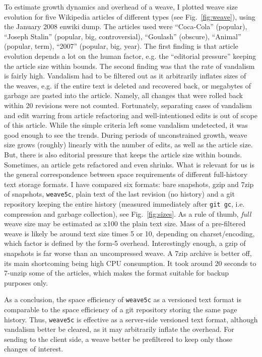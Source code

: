 \documentclass{sig-alternate}
\begin{document}
To estimate growth dynamics and overhead of a weave, I plotted weave size evolution for five Wikipedia articles of different types (see Fig.~\ref{fig:weave}), using the January 2008 enwiki dump.
The articles used were ``Coca-Cola'' (popular), ``Joseph Stalin'' (popular, big, controversial), ``Goulash'' (obscure), ``Animal'' (popular, term), ``2007'' (popular, big, year).
The first finding is that article evolution depends a lot on the human factor, e.g. the ``editorial pressure'' keeping the article size within bounds.
The second finding was that the rate of vandalism is fairly high.
Vandalism had to be filtered out as it arbitrarily inflates sizes of the weaves, e.g. if the entire text is deleted and recovered back, or megabytes of garbage are pasted into the article.
Namely, all changes that were rolled back within 20 revisions were  not counted.
Fortunately, separating cases of vandalism and edit warring from article refactoring and well-intentioned edits is out of scope of this article.
While the simple criteria left some vandalism undetected, it was good enough to see the trends.
During periods of unconstrained growth, weave size grows (roughly) linearly with the number of edits, as well as the article size.
But, there is also editorial pressure that keeps the article size within bounds. Sometimes, an article gets refactored and even shrinks.
What is relevant for us is the general correspondence between space requirements of different full-history text storage formats.
I have compared six formats: bare snapshots, gzip and 7zip of snapshots, {\tt weave5c}, plain text of the last revision (no history) and a git repository keeping the entire history (measured immediately after \verb+git gc+, i.e. compression and garbage collection), see Fig.~\ref{fig:sizes}.
As a rule of thumb, \emph{full} weave size may be estimated as x100 the plain text size.
Mass of a pre-filtered weave is likely be around text size times 5 or 10, depending on charset/encoding, which factor is defined by the form-5 overhead.
Interestingly enough, a gzip of snapshots is far worse than an uncompressed weave.
A 7zip archive is better off, its main shortcoming being high CPU consumption. It took around 20 seconds to 7-unzip some of the articles, which makes the format  suitable for backup purposes only.

As a conclusion, the space efficiency of {\tt weave5c} as a versioned text format is comparable to the space efficiency of a git repository storing the same page history.
Thus, {\tt weave5c} is effective as a server-side versioned text format, although vandalism better be cleared, as it may arbitrarily inflate the overhead.
For sending to the client side, a weave better be prefiltered to keep only those changes of interest.
\end{document}
